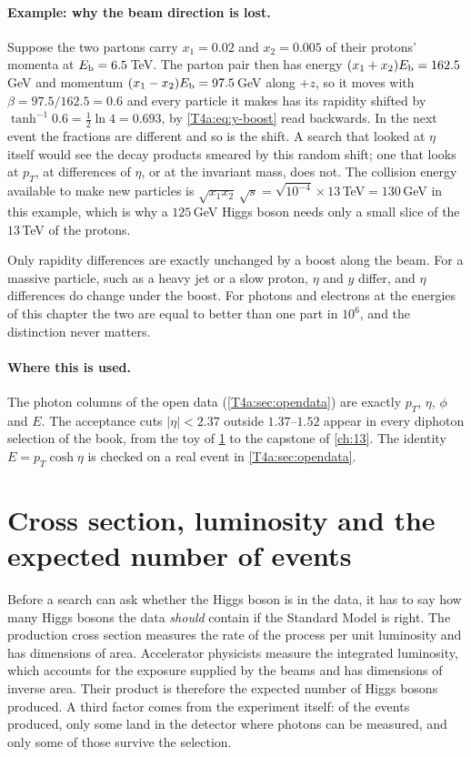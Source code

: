 \paragraph{Example: why the beam direction is lost.}
Suppose the two partons carry $x_1=0.02$ and $x_2=0.005$ of their protons' momenta at $E_{\rm b}=6.5$\,TeV. The parton pair then has energy $(x_1+x_2)E_{\rm b}=162.5$\,GeV and momentum $(x_1-x_2)E_{\rm b}=97.5$\,GeV along $+z$, so it moves with $\beta=97.5/162.5=0.6$ and every particle it makes has its rapidity shifted by $\tanh^{-1}0.6=\tfrac12\ln4=0.693$, by \eqref{T4a:eq:y-boost} read backwards. In the next event the fractions are different and so is the shift. A search that looked at $\eta$ itself would see the decay products smeared by this random shift; one that looks at $p_T$, at differences of $\eta$, or at the invariant mass, does not. The collision energy available to make new particles is $\sqrt{x_1x_2}\,\sqrt s=\sqrt{10^{-4}}\times13$\,TeV$=130$\,GeV in this example, which is why a $125$\,GeV Higgs boson needs only a small slice of the $13$\,TeV of the protons.

\begin{pitfall}
Only rapidity differences are exactly unchanged by a boost along the beam. For a massive particle, such as a heavy jet or a slow proton, $\eta$ and $y$ differ, and $\eta$ differences do change under the boost. For photons and electrons at the energies of this chapter the two are equal to better than one part in $10^{6}$, and the distinction never matters.
\end{pitfall}

\paragraph{Where this is used.}
The photon columns of the open data (\cref{T4a:sec:opendata}) are exactly $p_T$, $\eta$, $\phi$ and $E$. The acceptance cuts $\lvert\eta\rvert<2.37$ outside $1.37$--$1.52$ appear in every diphoton selection of the book, from the toy of \cref{T4a:sec:xsec} to the capstone of \cref{ch:13}. The identity $E=p_T\cosh\eta$ is checked on a real event in \cref{T4a:sec:opendata}.
\section{Cross section, luminosity and the expected number of events}
\label{T4a:sec:xsec}

Before a search can ask whether the Higgs boson is in the data, it has to say how many Higgs bosons the data \emph{should} contain if the Standard Model is right. The production cross section measures the rate of the process per unit luminosity and has dimensions of area. Accelerator physicists measure the integrated luminosity, which accounts for the exposure supplied by the beams and has dimensions of inverse area. Their product is therefore the expected number of Higgs bosons produced. A third factor comes from the experiment itself: of the events produced, only some land in the detector where photons can be measured, and only some of those survive the selection.

